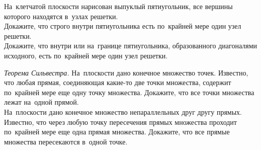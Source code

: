 \begin{problems}
\item
\begin{minipage}[t][][t]{0.79\linewidth}
На~клетчатой плоскости нарисован выпуклый пятиугольник, все вершины которого
находятся в~узлах решетки.
\\
\subproblem
Докажите, что строго внутри пятиугольника есть по~крайней мере один узел
решетки.
\\
\subproblem
Докажите, что внутри или на~границе пятиугольника, образованного диагоналями
исходного, есть по~крайней мере один узел решетки.
\end{minipage}\hfill
\begin{minipage}[t][][b]{0.18\linewidth}
    \vspace{-1ex}
\end{minipage}

\item \emph{Теорема Сильвестра.}
\subproblem
На~плоскости дано конечное множество точек.
Известно, что любая прямая, соединяющая какие-то две точки множества, содержит
по~крайней мере еще одну точку множества.
Докажите, что все точки множества лежат на~одной прямой.
\\
\subproblem
На~плоскости дано конечное множество непараллельных друг другу прямых.
Известно, что через любую точку пересечения прямых множества проходит
по~крайней мере еще одна прямая множества.
Докажите, что все прямые множества пересекаются в~одной точке.

\end{problems}

